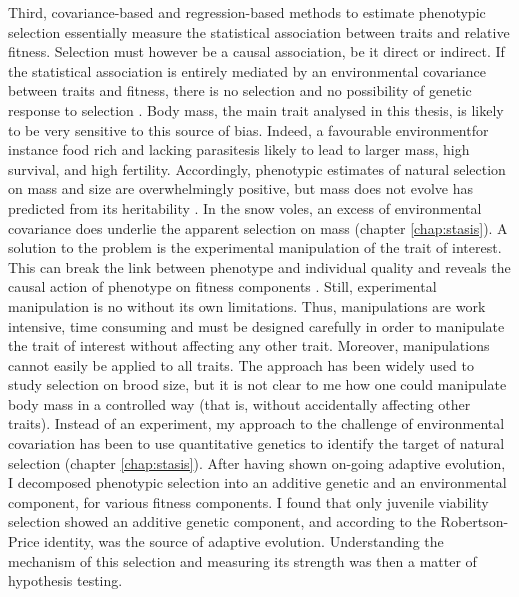 Third, covariance-based and regression-based methods to estimate phenotypic selection essentially measure the statistical association between traits and relative fitness. Selection must however be a causal association, be it direct or indirect. If the statistical association is entirely mediated by an environmental covariance between traits and fitness, there is no selection and no possibility of genetic response to selection \parencite{Price1989, Rausher1992}. 
Body mass, the main trait analysed in this thesis, is likely to be very sensitive to this source of bias. Indeed, a favourable environment\textemdash for instance food rich and lacking parasites\textemdash is likely to lead to larger mass, high survival, and high fertility. Accordingly, phenotypic estimates of natural selection on mass and size are overwhelmingly positive, but mass does not evolve has predicted from its heritability \parencite{Blanckenhorn2000, Kingsolver2012}. In the snow voles, an excess of environmental covariance does underlie the apparent selection on mass (chapter \ref{chap:stasis}).
A solution to the problem is the experimental manipulation of the trait of interest. This can break the link between phenotype and individual quality and reveals the causal action of phenotype on fitness components \parencite[e.g.][]{Tinbergen2004, Tschirren2006}. Still, experimental manipulation is no without its own limitations.
Thus, manipulations are work intensive, time consuming and must be designed carefully in order to manipulate the trait of interest without affecting any other trait. Moreover, manipulations cannot easily be applied to all traits. The approach has been widely used to study selection on brood size, but it is not clear to me how one could manipulate body mass in a controlled way (that is, without accidentally affecting other traits).
Instead of an experiment, my approach to the challenge of environmental covariation has been to use quantitative genetics to identify the target of natural selection (chapter \ref{chap:stasis}). After having shown on-going adaptive evolution, I decomposed phenotypic selection into an additive genetic and an environmental component, for various fitness components. I found that only juvenile viability selection showed an additive genetic component, and according to the Robertson-Price identity, was the source of adaptive evolution. Understanding the mechanism of this selection and measuring its strength was then a matter of hypothesis testing.
